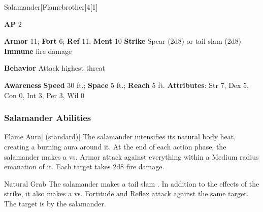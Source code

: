 \begin{monsection}{Salamander}[Flamebrother]{4}[1]
\vspace{-1em}\vspace{-1em}
\begin{spellcontent}
\begin{spelltargetinginfo}
{\textbf{AP} 2}

\pari \textbf{Armor} 11;
\textbf{Fort} 6;
\textbf{Ref} 11;
\textbf{Ment} 10
\pari \textbf{Strike} Spear  (2d8) or tail slam  (2d8)
\pari \textbf{Immune} fire damage


\pari \textbf{Behavior} Attack highest threat
\end{spelltargetinginfo}
\end{spellcontent}

\begin{monsterfooter}
\pari \textbf{Awareness} 
\pari \textbf{Speed} 30 ft.;
\textbf{Space} 5 ft.;
\textbf{Reach} 5 ft.
\pari \textbf{Attributes}:
Str 7,
Dex 5,
Con 0,
Int 3,
Per 3,
Wil 0
\end{monsterfooter}
\end{monsection}


\subsubsection{Salamander Abilities}

\begin{apability}{Flame Aura}[ (standard)]
The salamander intensifies its natural body heat, creating a burning aura around it.
At the end of each action phase, the salamander makes a  vs. Armor
attack against everything within a Medium radius emanation of it.
\hit Each target takes 2d8 fire damage.
\end{apability}

\vspace{0.5em}
\begin{freeability}{Natural Grab}
The salamander makes a tail slam .
In addition to the effects of the strike, it also makes a  vs. Fortitude and Reflex attack against the same target.
\hit The target is  by the salamander.
\end{freeability}

